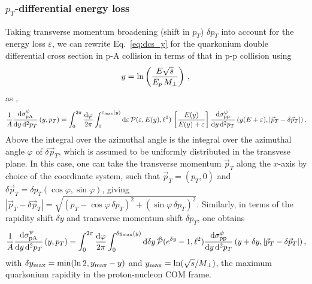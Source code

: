 \documentclass[11pt,onecolumn]{article}
\newcommand{\dd}{{\rm d}}
\newcommand{\beq}{\begin{equation}}
\newcommand{\eeq}{\end{equation}}
\begin{document}
\subsubsection{$p_T$-differential energy loss}

Taking transverse momentum broadening (shift in $p_T$) $\delta p_T$ into account for the energy loss $\varepsilon$, we can rewrite Eq.~\eqref{eq:dcs_y} for the quarkonium double differential cross section in p-A collision in terms of that in p-p collision using 
%
\beq
y = \ln\left( \frac{E \sqrt{s}}{E_p \, M_\perp} \right) \, , \nonumber \\
\label{eq:dydE2}
\eeq
%
as \cite{Arleo:2013zua},
%
%
\beq
\frac{1}{A}\frac{\dd\sigma_{\mathrm{pA}}^{\psi}}{\dd y \, \dd^2 p_T}\left(y, p_T \right)  = \int_{0}^{2\pi} \frac{\dd \varphi}{2\pi} \int_0^{\varepsilon_{\rm max}(y)} \dd \varepsilon \,{\cal P}(\varepsilon, E(y), \ell^2) \, \left[ \frac{E(y)}{E(y)+\varepsilon} \right] \frac{\dd\sigma_{\mathrm{pp}}^{\psi}}{\dd y \, \dd^2 p_T} \left( y(E+\varepsilon), | \vec{p}_T - \delta \vec{p}_T | \right) .
\label{eq:dcs_ypt2}
\eeq
%
{\color{red}
Above the integral over the azimuthal angle is the integral over the azimuthal angle $\varphi$ of $\delta \vec{p}_T$, which is assumed to be uniformly distributed in the transvese plane.  In this case, one can take the transverse momentum $\vec{p}_T$ along the $x$-axis by choice of the coordinate system, such that $\vec{p}_T = (p_T,0)$ and $\delta \vec{p}_T = \delta p_T (\cos\varphi,\sin\varphi)$, giving $| \vec{p}_T - \delta \vec{p}_T | = \sqrt{(p_T - \cos\varphi \, \delta p_T)^2 + (\sin\varphi \, \delta p_T)^2}$.
}
Similarly, in terms of the rapidity shift $\delta y$ and transverse momentum shift $\delta p_T$, one obtains
%
\beq
\frac{1}{A}\frac{\dd\sigma_{\mathrm{pA}}^{\psi}}{\dd y \, \dd^2 p_T}\left(y, p_T \right)  = \int_{0}^{2\pi} \frac{\dd \varphi}{2\pi} \int_0^{\delta y_{\rm max}(y)} \dd \delta y \,\hat{\cal P}(e^{\delta y} - 1, \ell^2) \frac{\dd\sigma_{\mathrm{pp}}^{\psi}}{\dd y \, \dd^2 p_T} \left( y + \delta y, | \vec{p}_T - \delta \vec{p}_T | \right) ,
\label{eq:dcs_ypt2_2}
\eeq
%
with $\delta y_{\rm max} = \text{min}(\ln 2, y_{\rm max}-y)$ and $y_{\rm max} = \ln(\sqrt{s}/M_\perp)$, the maximum quarkonium rapidity in the proton-nucleon COM frame. 

%
\end{document}
